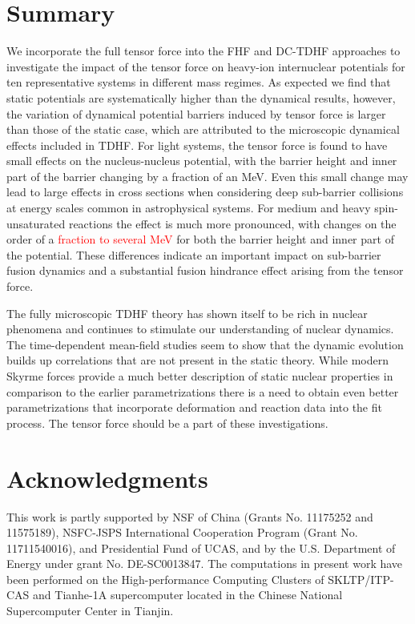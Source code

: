 \documentclass[aps,prc,twocolumn,showpacs,superscriptaddress,longbibliography,nofootinbib,floatfix,10pt]{revtex4-1}
\begin{document}
\section{Summary}
We incorporate the full tensor force into the FHF and DC-TDHF approaches to investigate the impact of the tensor force on heavy-ion internuclear potentials for ten representative systems in different mass regimes.
As expected we find that static potentials are systematically higher than the dynamical results, however, the variation of dynamical potential barriers induced by tensor force
is larger than those of the static case, which are attributed to the microscopic dynamical effects included in TDHF.
For light systems, the tensor force is found to have small effects on the nucleus-nucleus potential, with the barrier height and inner part of the barrier changing by a fraction of an MeV. Even this small change may lead to large effects in cross sections when considering deep sub-barrier collisions at energy scales common in astrophysical systems.
For medium and heavy spin-unsaturated reactions the effect is much more pronounced, with changes on the order of a \textcolor{red} {fraction to several MeV} for both the barrier height and inner part of the potential. These differences indicate an important impact on sub-barrier fusion dynamics and a substantial fusion hindrance effect arising from the tensor force.

The fully microscopic TDHF theory has shown itself to be rich in
nuclear phenomena and continues to stimulate our understanding of nuclear dynamics.
The time-dependent mean-field studies seem to show that the dynamic evolution
builds up correlations that are not present in the static theory.
While modern Skyrme forces provide a much better description of static nuclear properties
in comparison to the earlier parametrizations there is a need to obtain even better
parametrizations that incorporate deformation and reaction data into the fit process.
The tensor force should be a part of these investigations.
\label{summary}

\section{Acknowledgments}
This work is partly supported by NSF of China (Grants No. 11175252 and 11575189),
NSFC-JSPS International Cooperation Program (Grant No. 11711540016), and Presidential Fund of UCAS,
and by the U.S. Department of Energy under grant No. DE-SC0013847.
The computations in present work have been performed on the High-performance Computing Clusters of SKLTP/ITP-CAS and
Tianhe-1A supercomputer located in the Chinese National Supercomputer Center in Tianjin.


\end{document}
